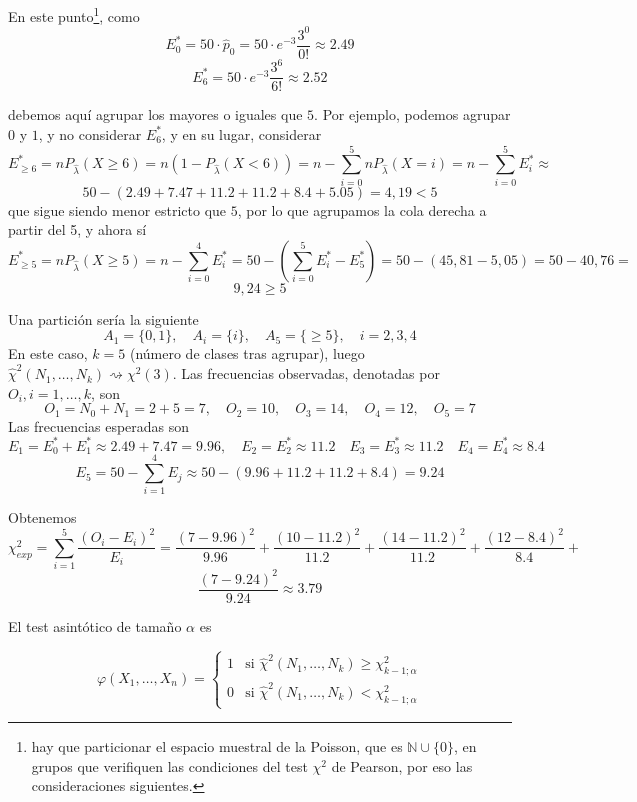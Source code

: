 \documentclass[12pt]{article}
\newcommand{\N}{\mathbb{N}}
\begin{document}
\begin{ejercicio}
\begin{enumerate}
            En este punto\footnote{hay que particionar el espacio muestral de la Poisson, que
            es $\N \cup \{0\}$, en grupos que verifiquen las condiciones del test $\chi^2$ de Pearson, por eso las consideraciones siguientes.}, como 
            $$E^*_0 = 50 \cdot \hat{p}_0 = 50 \cdot e^{-3} \dfrac{3^0}{0!} \approx 2.49$$
            $$E^*_6 = 50 \cdot e^{-3} \dfrac{3^6}{6!} \approx 2.52$$
            
            debemos aquí agrupar los mayores o iguales que $5$. Por ejemplo, podemos agrupar $0$ y $1$, y no considerar $E^*_6$, y en su lugar, considerar
            $$E^*_{\geq 6} = n P_{\hat{\lambda}}(X \geq 6) = n (1 - P_{\hat{\lambda}}(X < 6)) = n - \sum_{i=0}^{5} n P_{\hat{\lambda}}(X = i) =  n - \sum_{i=0}^{5} E_i^* \approx $$
            $$50 - (2.49 + 7.47 + 11.2 + 11.2 + 8.4 + 5.05) = 4,19 < 5$$
            que sigue siendo menor estricto que $5$, por lo que agrupamos la cola derecha a partir del 5, y ahora sí
            $$E^*_{\geq 5} = n P_{\hat{\lambda}}(X \geq 5) = n - \sum_{i=0}^{4} E_i^* = 50 - \left(\sum_{i=0}^{5} E_i^* - E_5^* \right) = 50 - (45,81 - 5,05) = 50 - 40,76 = $$
            $$9,24 \geq 5$$

            Una partición sería la siguiente
            $$A_1 = \{0,1\}, \quad A_i = \{i\}, \quad A_5 = \{\geqslant 5\}, \quad i = 2,3,4$$
            En este caso, $k=5$ (número de clases tras agrupar), luego
            $\hat{\chi}^2(N_1, \ldots, N_k) \rightsquigarrow \chi^2(3)$. Las frecuencias observadas, denotadas por $O_i, i= 1,\ldots,k$, son 
            $$O_1 = N_0 + N_1 = 2 + 5 = 7, \quad O_2 = 10, \quad O_3 = 14, \quad O_4 = 12, \quad O_5 = 7$$
            Las frecuencias esperadas son 
            $$E_1 = E^*_0 + E^*_1 \approx 2.49 + 7.47 = 9.96, \quad E_2 = E^*_2 \approx 11.2 \quad E_3 = E^*_3 \approx 11.2 
            \quad E_4 = E^*_4 \approx 8.4$$$$E_5 = 50 - \sum_{i=1}^{4} E_j \approx 50 - (9.96 + 11.2 + 11.2 + 8.4) = 9.24$$

            Obtenemos $$\chi^2_{exp} = \sum_{i=1}^{5} \dfrac{(O_i - E_i)^2}{E_i} = \dfrac{(7 - 9.96)^2}{9.96} + \dfrac{(10 - 11.2)^2}{11.2} +
            \dfrac{(14 - 11.2)^2}{11.2} + \dfrac{(12 - 8.4)^2}{8.4} + $$$$\dfrac{(7 - 9.24)^2}{9.24} \approx 3.79$$

            El test asintótico de tamaño $\alpha$ es

            $$\varphi(X_1, \ldots, X_n) = \begin{cases}
                1 &\text{si } \hat{\chi}^2(N_1, \ldots, N_k) \geqslant \chi^2_{k-1;\alpha} \\
                0 &\text{si } \hat{\chi}^2(N_1, \ldots, N_k) < \chi^2_{k-1;\alpha}
            \end{cases}$$


\end{enumerate}
\end{ejercicio}
\end{document}
